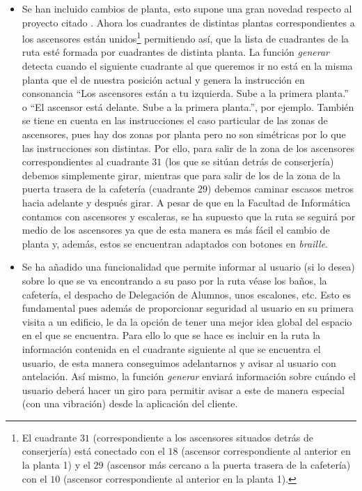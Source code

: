 \begin{itemize}
	
	\item Se han incluido cambios de planta, esto supone una gran novedad respecto al proyecto citado \cite{TFGguia}. Ahora los cuadrantes de distintas plantas correspondientes a los ascensores están unidos\footnote{El cuadrante $31$ (correspondiente a los ascensores situados detrás de conserjería) está conectado con el $18$ (ascensor correspondiente al anterior en la planta 1) y el $29$ (ascensor más cercano a la puerta trasera de la cafetería) con el $10$ (ascensor correspondiente al anterior en la planta 1).} permitiendo así, que la lista de cuadrantes de la ruta esté formada por cuadrantes de distinta planta. La función \textit{generar} detecta cuando el siguiente cuadrante al que queremos ir no está en la misma planta que el de nuestra posición actual y genera la instrucción en consonancia ``Los ascensores están a tu izquierda. Sube a la primera planta.'' o ``El ascensor está delante. Sube a la primera planta.'', por ejemplo. También se tiene en cuenta en las instrucciones el caso particular de las zonas de ascensores, pues hay dos zonas por planta pero no son simétricas por lo que las instrucciones son distintas. Por ello, para salir de la zona de los ascensores correspondientes al cuadrante $31$ (los que se sitúan detrás de conserjería) debemos simplemente girar, mientras que para salir de los de la zona de la puerta trasera de la cafetería (cuadrante $29$) debemos caminar escasos metros hacia adelante y después girar. A pesar de que en la Facultad de Informática contamos con ascensores y escaleras, se ha supuesto que la ruta se seguirá por medio de los ascensores ya que de esta manera es más fácil el cambio de planta y, además, estos se encuentran adaptados con botones en \textit{braille}.
	
	\item Se ha añadido una funcionalidad que permite informar al usuario (si lo desea) sobre lo que se va encontrando a su paso por la ruta véase los baños, la cafetería, el despacho de Delegación de Alumnos, unos escalones, etc. Esto es fundamental pues además de proporcionar seguridad al usuario en su primera visita a un edificio, le da la opción de tener una mejor idea global del espacio en el que se encuentra. Para ello lo que se hace es incluir en la ruta la información contenida en el cuadrante siguiente al que se encuentra el usuario, de esta manera conseguimos adelantarnos y avisar al usuario con antelación. Así mismo, la función \textit{generar} enviará información sobre cuándo el usuario deberá hacer un giro para permitir avisar a este de manera especial (con una vibración) desde la aplicación del cliente.
	
\end{itemize}



